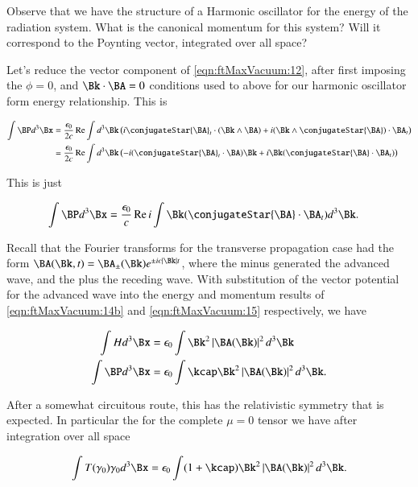 Observe that we have the structure of a Harmonic oscillator for the energy of the radiation system.  What is the canonical momentum for this system?  Will it correspond to the Poynting vector, integrated over all space?

Let's reduce the vector component of \autoref{eqn:ftMaxVacuum:12}, after first imposing the $\phi=0$, and $\Bk \cdot \BA = 0$ conditions used to above for our harmonic oscillator form energy relationship.  This is

\begin{align*}
\int \BP d^3 \Bx 
&=
\frac{\epsilon_0}{2 c} \Real 
\int d^3 \Bk \left( 
i \conjugateStar{\BA}_t \cdot (\Bk \wedge \BA)
+ i (\Bk \wedge \conjugateStar{\BA}) \cdot \BA_t
\right) \\
&=
\frac{\epsilon_0}{2 c} \Real 
\int d^3 \Bk \left( 
-i (\conjugateStar{\BA}_t \cdot \BA) \Bk
+ i \Bk (\conjugateStar{\BA} \cdot \BA_t)
\right)
\end{align*}

This is just

\begin{align}
\label{eqn:ftMaxVacuum:15}
\int \BP d^3 \Bx 
&=
\frac{\epsilon_0}{c} \Real 
i \int 
\Bk (\conjugateStar{\BA} \cdot \BA_t) d^3 \Bk.
\end{align}

Recall that the Fourier transforms for the transverse propagation case had the form $\BA(\Bk, t) = \BA_{\pm}(\Bk) e^{\pm i c \Abs{\Bk} t}$, where the minus generated the advanced wave, and the plus the receding wave.  With substitution of the vector potential for the advanced wave into the energy and momentum results of \autoref{eqn:ftMaxVacuum:14b} and \autoref{eqn:ftMaxVacuum:15} respectively, we have

\begin{align}\label{eqn:ftMaxVacuum:80}
\int H d^3 \Bx   &= \epsilon_0 \int \Bk^2 \Abs{\BA(\Bk)}^2 d^3 \Bk \\
\int \BP d^3 \Bx &= \epsilon_0 \int \kcap \Bk^2 \Abs{\BA(\Bk)}^2 d^3 \Bk.
\end{align}

After a somewhat circuitous route, this has the relativistic symmetry that is expected.  In particular the for the complete $\mu=0$ tensor we have after integration over all space

\begin{align}\label{eqn:ftMaxVacuum:81}
\int 
T(\gamma_0) \gamma_0 d^3 \Bx = \epsilon_0 \int (1 + \kcap) \Bk^2 \Abs{\BA(\Bk)}^2 d^3 \Bk.
\end{align}

